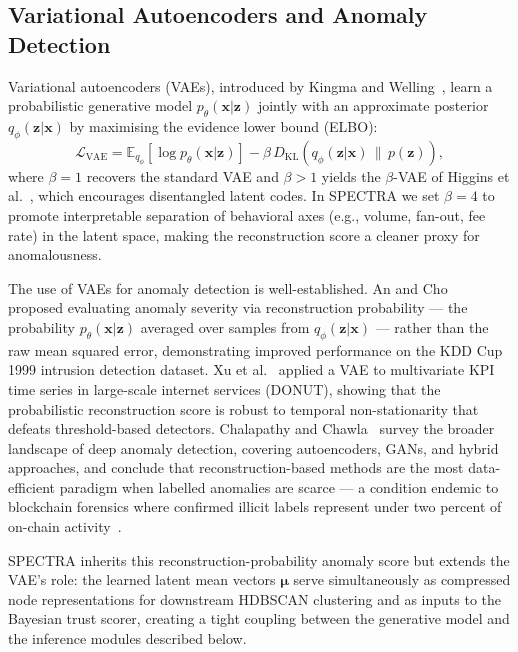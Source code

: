 \subsection{Variational Autoencoders and Anomaly Detection}
\label{subsec:vae}

Variational autoencoders (VAEs), introduced by Kingma and Welling~\cite{Kingma2014},
learn a probabilistic generative model $p_\theta(\mathbf{x}|\mathbf{z})$ jointly
with an approximate posterior $q_\phi(\mathbf{z}|\mathbf{x})$ by maximising the
evidence lower bound (ELBO):
\begin{equation}
  \mathcal{L}_{\text{VAE}} =
      \mathbb{E}_{q_\phi}\!\left[\log p_\theta(\mathbf{x}|\mathbf{z})\right]
      - \beta\,D_{\mathrm{KL}}\!\left(q_\phi(\mathbf{z}|\mathbf{x}) \,\|\,
        p(\mathbf{z})\right),
  \label{eq:elbo}
\end{equation}
where $\beta=1$ recovers the standard VAE and $\beta > 1$ yields the
$\beta$-VAE of Higgins et al.~\cite{Higgins2017}, which encourages
disentangled latent codes.  In SPECTRA we set $\beta = 4$ to promote
interpretable separation of behavioral axes (e.g., volume, fan-out, fee rate)
in the latent space, making the reconstruction score a cleaner proxy for
anomalousness.

The use of VAEs for anomaly detection is well-established.  An and
Cho~\cite{AnCho2015} proposed evaluating anomaly severity via reconstruction
probability --- the probability $p_\theta(\mathbf{x}|\mathbf{z})$ averaged over
samples from $q_\phi(\mathbf{z}|\mathbf{x})$ --- rather than the raw mean squared
error, demonstrating improved performance on the KDD Cup 1999 intrusion
detection dataset.  Xu et al.~\cite{Xu2018} applied a VAE to multivariate KPI
time series in large-scale internet services (DONUT), showing that the
probabilistic reconstruction score is robust to temporal non-stationarity that
defeats threshold-based detectors.  Chalapathy and
Chawla~\cite{Chalapathy2019} survey the broader landscape of deep
anomaly detection, covering autoencoders, GANs, and hybrid
approaches, and conclude that reconstruction-based methods are the most
data-efficient paradigm when labelled anomalies are scarce --- a condition
endemic to blockchain forensics where confirmed illicit labels represent under
two percent of on-chain activity~\cite{Chainalysis2023}.

SPECTRA inherits this reconstruction-probability anomaly score but extends the
VAE's role: the learned latent mean vectors $\boldsymbol{\mu}$ serve
simultaneously as compressed node representations for downstream HDBSCAN
clustering and as inputs to the Bayesian trust scorer, creating a tight coupling
between the generative model and the inference modules described below.

